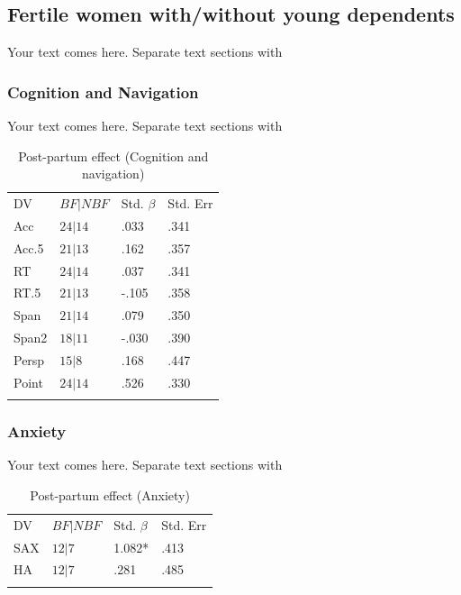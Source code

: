 	\subsection{Fertile women with/without young dependents}
	\label{sec:3.3}
Your text comes here. Separate text sections with

		\subsubsection{Cognition and Navigation}
		\label{sec:3.3.1}
Your text comes here. Separate text sections with	

\begin{table}
\caption{Post-partum effect (Cognition and navigation)}
\label{tab:bf_cog}  
\begin{tabular}{llll}
\hline\noalign{\smallskip}
DV & $BF|NBF$ & Std. $\beta$ & Std. Err  \\
\noalign{\smallskip}\hline\noalign{\smallskip}
Acc & $24|14$ & .033 & .341 \\
Acc.5 & $21|13$ & .162 & .357 \\
RT & $24|14$ & .037 & .341 \\
RT.5 & $21|13$ & -.105 & .358 \\
Span & $21|14$ & .079 & .350 \\
Span2 & $18|11$ & -.030 & .390 \\
Persp & $15|8$ & .168 & .447 \\
Point & $24|14$ & .526 & .330 \\
\noalign{\smallskip}\hline
\end{tabular}
\end{table}

		\subsubsection{Anxiety}
		\label{sec:3.3.2}
Your text comes here. Separate text sections with	

\begin{table}
\caption{Post-partum effect (Anxiety)}
\label{tab:bf_anx}  
\begin{tabular}{llll}
\hline\noalign{\smallskip}
DV & $BF|NBF$ & Std. $\beta$ & Std. Err  \\
\noalign{\smallskip}\hline\noalign{\smallskip}
SAX & $12|7$ & 1.082* & .413 \\
HA & $12|7$ & .281 & .485 \\
\noalign{\smallskip}\hline
\end{tabular}
\end{table}


